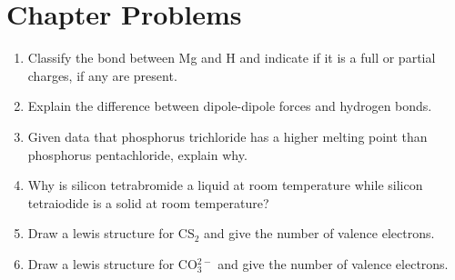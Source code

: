\documentclass[../hchem.tex]{subfiles}
\begin{document}
\section*{Chapter Problems}
\begin{enumerate}
    \item Classify the bond between Mg and H and indicate if it is a full or partial charges, if any are present.
    \item Explain the difference between dipole-dipole forces and hydrogen bonds.
    \item Given data that phosphorus trichloride has a higher melting point than phosphorus pentachloride, explain why.
    \item Why is silicon tetrabromide a liquid at room temperature while silicon tetraiodide is a solid at room temperature?
    \item Draw a lewis structure for CS$_2$ and give the number of valence electrons.
    \item Draw a lewis structure for CO$_3^{2-}$ and give the number of valence electrons.
\end{enumerate}
\end{document}
